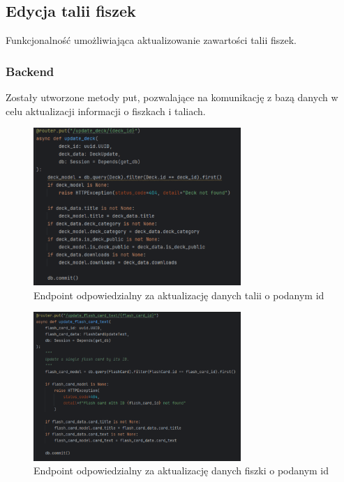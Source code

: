\subsection{Edycja talii fiszek}

Funkcjonalność umożliwiająca aktualizowanie zawartości talii fiszek.

\subsubsection{Backend}

Zostały utworzone metody put, pozwalające na komunikację z bazą danych w celu aktualizacji informacji o fiszkach i taliach.

\begin{figure}[H]
    \centering
    \includegraphics[width=0.7\textwidth]{chapters/chapter_8/screens/update_deck_backend}
    \caption{Endpoint odpowiedzialny za aktualizację danych talii o podanym id}
    \label{img:update_deck_backend}
\end{figure}

\begin{figure}[H]
    \centering
    \includegraphics[width=0.7\textwidth]{chapters/chapter_8/screens/update_flash_card_text_backend}
    \caption{Endpoint odpowiedzialny za aktualizację danych fiszki o podanym id}
    \label{img:update_flash_card_backend}
\end{figure}

